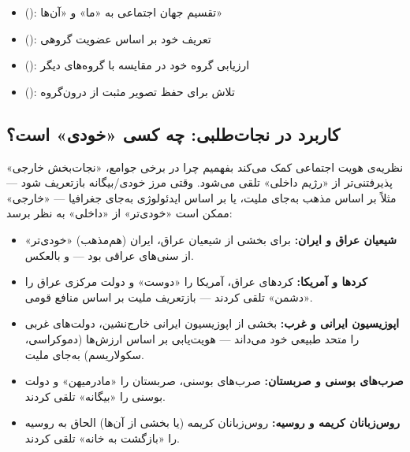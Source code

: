 \begin{tcolorbox}[defbox, title={مفاهیم کلیدی: نظریه‌ی هویت اجتماعی}]
\begin{itemize}
\item {} (): تقسیم جهان اجتماعی به «ما» و «آن‌ها»
\item {} (): تعریف خود بر اساس عضویت گروهی
\item {} (): ارزیابی گروه خود در مقایسه با گروه‌های دیگر
\item {} (): تلاش برای حفظ تصویر مثبت از درون‌گروه
\end{itemize}
\end{tcolorbox}

\subsection{کاربرد در نجات‌طلبی: چه کسی «خودی» است؟}
\label{subsec:ch11-sit-intervention}

نظریه‌ی هویت اجتماعی کمک می‌کند بفهمیم چرا در برخی جوامع، «نجات‌بخش خارجی» پذیرفتنی‌تر از «رژیم داخلی» تلقی می‌شود. وقتی مرز خودی/بیگانه بازتعریف شود — مثلاً بر اساس مذهب به‌جای ملیت، یا بر اساس ایدئولوژی به‌جای جغرافیا — «خارجی» ممکن است «خودی‌تر» از «داخلی» به نظر برسد:

\begin{tcolorbox}[casebox, title={نمونه‌ها: بازتعریف مرز خودی/بیگانه}]
\begin{itemize}
\item \textbf{شیعیان عراق و ایران:} برای بخشی از شیعیان عراق، ایران (هم‌مذهب) «خودی‌تر» از سنی‌های عراقی بود — و بالعکس.
\item \textbf{کردها و آمریکا:} کردهای عراق، آمریکا را «دوست» و دولت مرکزی عراق را «دشمن» تلقی کردند — بازتعریف ملیت بر اساس منافع قومی.
\item \textbf{اپوزیسیون ایرانی و غرب:} بخشی از اپوزیسیون ایرانی خارج‌نشین، دولت‌های غربی را متحد طبیعی خود می‌داند — هویت‌یابی بر اساس ارزش‌ها (دموکراسی، سکولاریسم) به‌جای ملیت.
\item \textbf{صرب‌های بوسنی و صربستان:} صرب‌های بوسنی، صربستان را «مادرمیهن» و دولت بوسنی را «بیگانه» تلقی کردند.
\item \textbf{روس‌زبانان کریمه و روسیه:} روس‌زبانان کریمه (یا بخشی از آن‌ها) الحاق به روسیه را «بازگشت به خانه» تلقی کردند.
\end{itemize}
\end{tcolorbox}

